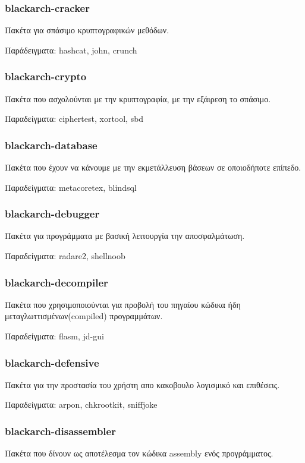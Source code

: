 \documentclass[a4paper, oneside, 11pt]{book}
\begin{document}
\subsubsection{blackarch-cracker}
Πακέτα για σπάσιμο κρυπτογραφικών μεθόδων.

Παράδειγματα: hashcat, john, crunch

\subsubsection{blackarch-crypto}
Πακέτα που ασχολούνται με την κρυπτογραφία, με την εξάιρεση το σπάσιμο.

Παραδείγματα: ciphertest, xortool, sbd

\subsubsection{blackarch-database}
Πακέτα που έχουν να κάνουμε με την εκμετάλλευση βάσεων σε
οποιοδήποτε επίπεδο.

Παραδείγματα: metacoretex, blindsql

\subsubsection{blackarch-debugger}
Πακέτα για προγράμματα με βασική λειτουργία την αποσφαλμάτωση.

Παραδείγματα: radare2, shellnoob

\subsubsection{blackarch-decompiler}
Πακέτα που χρησιμοποιούνται για προβολή του πηγαίου κώδικα
ήδη μεταγλωττισμένων(compiled) προγραμμάτων.

Παραδείγματα: flasm, jd-gui

\subsubsection{blackarch-defensive}
Πακέτα για την προστασία του χρήστη απο κακοβουλο λογισμικό
και επιθέσεις.

Παραδείγματα: arpon, chkrootkit, sniffjoke

\subsubsection{blackarch-disassembler}
Πακέτα που δίνουν ως αποτέλεσμα τον κώδικα assembly ενός
προγράμματος.
\end{document}
